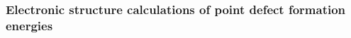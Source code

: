 \documentclass[11pt, twoside]{report}
\begin{document}

\subsubsection{Electronic structure calculations of point defect formation energies}
\end{document}
